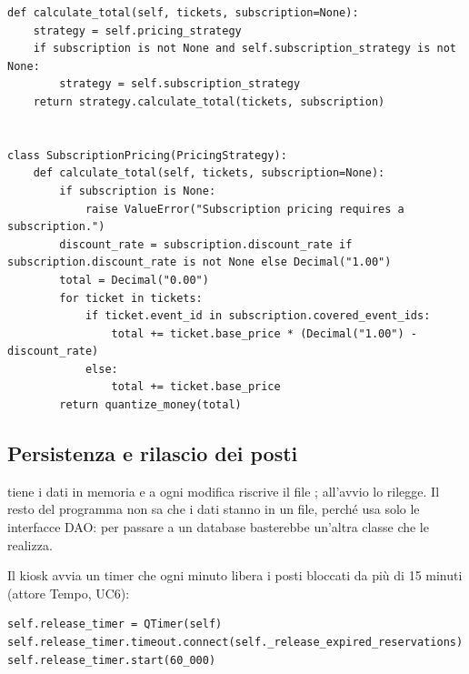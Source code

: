 \par\noindent\begin{minipage}{\linewidth}
\begin{lstlisting}
def calculate_total(self, tickets, subscription=None):
    strategy = self.pricing_strategy
    if subscription is not None and self.subscription_strategy is not None:
        strategy = self.subscription_strategy
    return strategy.calculate_total(tickets, subscription)


class SubscriptionPricing(PricingStrategy):
    def calculate_total(self, tickets, subscription=None):
        if subscription is None:
            raise ValueError("Subscription pricing requires a subscription.")
        discount_rate = subscription.discount_rate if subscription.discount_rate is not None else Decimal("1.00")
        total = Decimal("0.00")
        for ticket in tickets:
            if ticket.event_id in subscription.covered_event_ids:
                total += ticket.base_price * (Decimal("1.00") - discount_rate)
            else:
                total += ticket.base_price
        return quantize_money(total)
\end{lstlisting}
\end{minipage}\par

\subsection{Persistenza e rilascio dei posti}

 tiene i dati in memoria e a ogni modifica riscrive il file ; all'avvio lo rilegge. Il resto del programma non sa che i dati stanno in un file, perché usa solo le interfacce DAO: per passare a un database basterebbe un'altra classe che le realizza.

Il kiosk avvia un timer che ogni minuto libera i posti bloccati da più di 15 minuti (attore Tempo, UC6):

\par\noindent\begin{minipage}{\linewidth}
\begin{lstlisting}
self.release_timer = QTimer(self)
self.release_timer.timeout.connect(self._release_expired_reservations)
self.release_timer.start(60_000)
\end{lstlisting}
\end{minipage}\par
